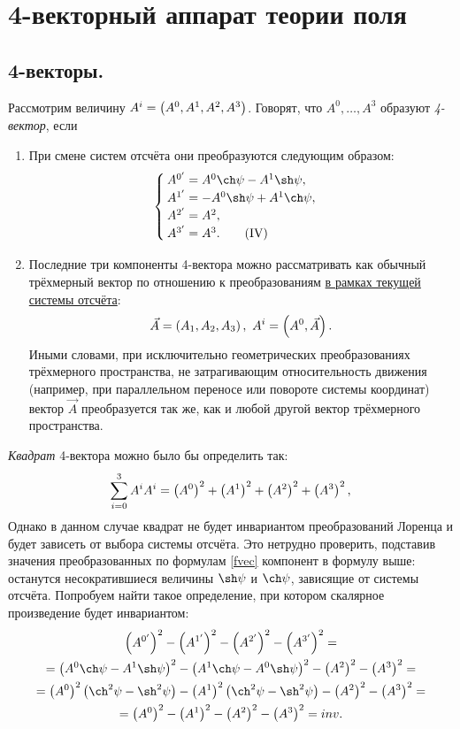 \newpage
\section{4-векторный аппарат теории поля}
\subsection{4-векторы.}
    Рассмотрим величину $A^i = \left({A^0, A^1, A^2, A^3}\right)$. Говорят, что $A^0, \ldots , A^3$ образуют {\it 4-вектор}, если
    \begin{enumerate}
        \item При смене систем отсчёта они преобразуются следующим образом:
            \[ \begin{cases}
                A^{0'} = A^0 \ch \psi - A^1 \sh \psi, \\
                A^{1'} = -A^0 \sh \psi + A^1 \ch \psi, \\
                A^{2'} = A^2, \\
                A^{3'} = A^3. \tag{\Romannum{4}} \label{fvec}
            \end{cases} \]
        \item Последние три компоненты 4-вектора  можно рассматривать как обычный трёхмерный вектор по отношению к преобразованиям \underline{в рамках текущей системы отсчёта}:
        \[
            \vec{A} = \left({A_1, A_2, A_3}\right), \ A^i = \left({A^0, \vec A}\right).
        \]
        Иными словами, при исключительно геометрических преобразованиях трёхмерного пространства, не затрагивающим относительность движения 
        (например, при параллельном переносе или повороте системы координат) вектор $\vec{A}$ преобразуется так же, как и любой другой вектор трёхмерного пространства.
    \end{enumerate}

    \textit{Квадрат} 4-вектора можно было бы определить так:
    \[
        \sum_{i=0}^3 A^i A^i = \left({A^0}\right)^2 + \left({A^1}\right)^2 + \left({A^2}\right)^2 + \left({A^3}\right)^2,
    \]
    Однако в данном случае квадрат не будет инвариантом преобразований Лоренца и будет зависеть от выбора системы отсчёта. Это нетрудно проверить, подставив значения преобразованных по формулам \ref{fvec} компонент в формулу выше: останутся несократившиеся величины $\sh \psi$ и $\ch \psi$, зависящие от системы отсчёта. Попробуем найти такое определение, при котором скалярное произведение будет инвариантом:
    \begin{gather*}
        \brackets{A^{0'}}^2 - \brackets{A^{1'}}^2 - \brackets{A^{2'}}^2 - \brackets{A^{3'}}^2 = \\ 
        = \brackets{A^0 \ch \psi - A^1 \sh \psi}^2 - \brackets{A^1 \ch \psi - A^0 \sh \psi}^2 - \brackets{A^2}^2  -  \brackets{A^3}^2 =  \\
        = \brackets{A^0}^2 \brackets{\ch^2\psi - \sh^2\psi} - \brackets{A^1}^2 \brackets{\ch^2\psi - \sh^2\psi} - \brackets{A^2}^2  -  \brackets{A^3}^2 = \\
        =\brackets{A^0}^2 - \brackets{A^1}^2 - \brackets{A^2}^2 - \brackets{A^3}^2 = inv.
    \end{gather*}

